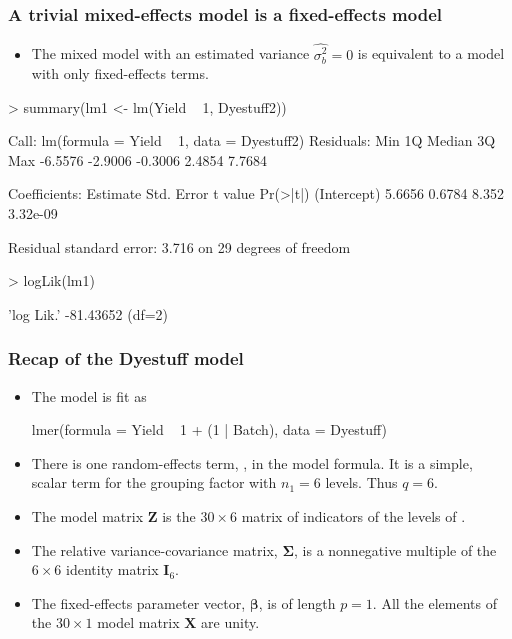 \begin{frame}[fragile]
  \frametitle{A trivial mixed-effects model is a fixed-effects model}
  \begin{itemize}
  \item The mixed model  with an estimated variance
    $\widehat{\sigma_b^2}=0$ is equivalent to a model with only
    fixed-effects terms.
  \end{itemize}
\begin{Schunk}
\begin{Sinput}
> summary(lm1 <- lm(Yield ~ 1, Dyestuff2))
\end{Sinput}
\begin{Soutput}
Call:
lm(formula = Yield ~ 1, data = Dyestuff2)
Residuals:
    Min      1Q  Median      3Q     Max 
-6.5576 -2.9006 -0.3006  2.4854  7.7684 

Coefficients:
            Estimate Std. Error t value Pr(>|t|)
(Intercept)   5.6656     0.6784   8.352 3.32e-09

Residual standard error: 3.716 on 29 degrees of freedom
\end{Soutput}
\begin{Sinput}
> logLik(lm1)
\end{Sinput}
\begin{Soutput}
'log Lik.' -81.43652 (df=2)
\end{Soutput}
\end{Schunk}
\end{frame}
\begin{frame}[fragile]
  \frametitle{Recap of the Dyestuff model}
  \begin{itemize}
  \item The model is fit as
\begin{Schunk}
\begin{Soutput}
lmer(formula = Yield ~ 1 + (1 | Batch), data = Dyestuff)
\end{Soutput}
\end{Schunk}
\item There is one random-effects term, , in the model
  formula.  It is a simple, scalar term for the grouping factor
   with $n_1=6$ levels.  Thus $q=6$.
\item The model matrix $\bm Z$ is the $30\times 6$ matrix of
  indicators of the levels of .
\item The relative variance-covariance matrix, $\bm\Sigma$, is a
  nonnegative multiple of the $6\times 6$ identity matrix $\bm I_6$.
\item The fixed-effects parameter vector, $\bm\beta$, is of length
  $p=1$.  All the elements of the $30\times 1$ model matrix $\bm X$
  are unity.
  \end{itemize}
\end{frame}

